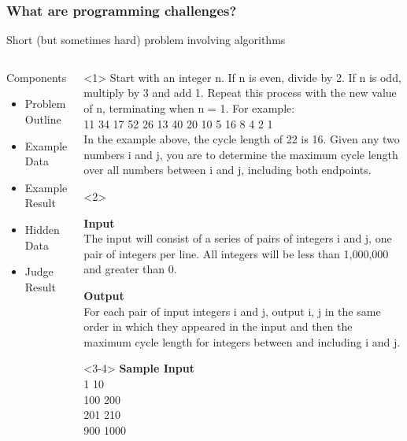 \documentclass{beamer}
\begin{document}
\begin{frame}
  \frametitle{What are programming challenges?}
  \begin{center}
    Short (but sometimes hard) problem involving algorithms
  \end{center}

  \begin{columns}[c]
    \begin{block}{Components}
      \begin{itemize}
      \item \alert<1>{Problem Outline}
      \item \alert<2-3>{Example Data}
      \item \alert<2-3>{Example Result}
      \item \alert<4>{Hidden Data}
      \item \alert<5>{Judge Result}
      \end{itemize}
    \end{block}
    \begin{block}{}
      \begin{onlyenv}<1>
        {\small
        Start with an integer n. If n is even, divide by 2. If n is
        odd, multiply by 3 and add 1. Repeat this process with the new
        value of n, terminating when n = 1. For example:\\
         11 34 17 52 26 13 40 20 10 5 16 8 4 2 1\\
        \medskip
        In the example above, the cycle length of 22 is 16. Given any
        two numbers i and j, you are to determine the maximum cycle
        length over all numbers between i and j, including both
        endpoints.}
      \end{onlyenv}
      \begin{onlyenv}<2>
        {\small
        {\bf Input}\\        
        The input will consist of a series of pairs of integers i and
        j, one pair of integers per line. All integers will be less
        than 1,000,000 and greater than 0.\\
        \smallskip

        {\bf Output}\\
        For each pair of input integers i and j, output i, j in the
        same order in which they appeared in the input and then the
        maximum cycle length for integers between and including i and
        j.}
      \end{onlyenv}
      \begin{onlyenv}<3-4>
        {\small
        {\bf Sample Input}\\
        1 10\\
        100 200\\
        201 210\\
        900 1000\\
        
}
\end{onlyenv}
\end{block}
\end{columns}
\end{frame}
\end{document}
